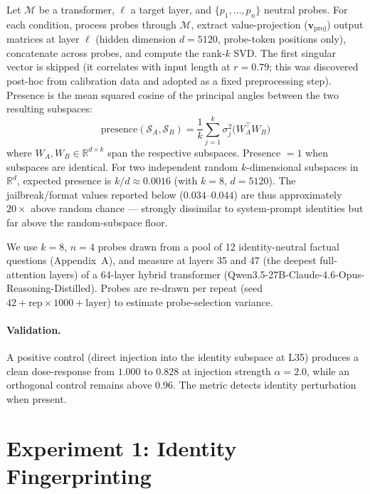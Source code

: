 \documentclass[11pt,a4paper]{article}
\begin{document}
Let $\mathcal{M}$ be a transformer, $\ell$ a target layer, and
$\{p_1, \ldots, p_n\}$ neutral probes. For each condition, process probes
through $\mathcal{M}$, extract value-projection ($\mathbf{v}_\text{proj}$)
output matrices at layer $\ell$ (hidden dimension $d{=}5120$,
probe-token positions only), concatenate across probes, and compute the
rank-$k$ SVD. The first singular vector is skipped (it correlates with
input length at $r = 0.79$; this was discovered post-hoc from
calibration data and adopted as a fixed preprocessing step). Presence
is the mean squared cosine of the principal angles between the two
resulting subspaces:
\begin{equation}
\text{presence}(\mathcal{S}_A, \mathcal{S}_B)
  = \frac{1}{k} \sum_{j=1}^{k} \sigma_j^2
    \bigl( W_A^\top W_B \bigr)
\end{equation}
where $W_A, W_B \in \mathbb{R}^{d \times k}$ span the respective
subspaces. Presence $= 1$ when subspaces are identical. For two
independent random $k$-dimensional subspaces in $\mathbb{R}^d$,
expected presence is $k/d \approx 0.0016$ (with $k{=}8$, $d{=}5120$).
The jailbreak/format values reported below ($0.034$--$0.044$) are thus
approximately $20\times$ above random chance --- strongly dissimilar to
system-prompt identities but far above the random-subspace floor.

We use $k = 8$, $n = 4$ probes drawn from a pool of 12
identity-neutral factual questions (Appendix~A), and measure at
layers 35 and 47 (the deepest full-attention layers) of a 64-layer hybrid
transformer (Qwen3.5-27B-Claude-4.6-Opus-Reasoning-Distilled). Probes
are re-drawn per repeat (seed $42 + \text{rep} \times 1000 + \text{layer}$)
to estimate probe-selection variance.

\paragraph{Validation.} A positive control (direct injection into the
identity subspace at L35) produces a clean dose-response from $1.000$ to
$0.828$ at injection strength $\alpha = 2.0$, while an orthogonal control remains above
$0.96$. The metric detects identity perturbation when present.

\section{Experiment 1: Identity Fingerprinting}
\label{sec:fingerprint}
\end{document}
